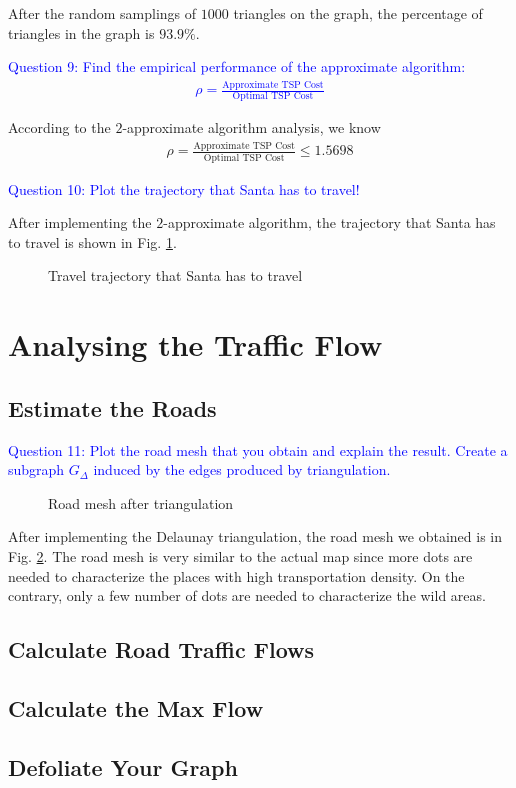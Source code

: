 \documentclass[11pt]{article}
\makeatletter
\def\maxwidth{\ifdim\Gin@nat@width>\linewidth\linewidth
    \else\Gin@nat@width\fi}
\let\Oldincludegraphics\includegraphics
\renewcommand{\includegraphics}[1]{\Oldincludegraphics[width=.8\maxwidth]{#1}}
\makeatother
\begin{document}
After the random samplings of $1000$ triangles on the graph, the percentage of triangles in the graph is $93.9\%$.


\textcolor{blue}{
    Question 9: Find the empirical performance of the approximate algorithm:
    \begin{align}
    \rho=\frac{\text{Approximate TSP Cost}}{\text{Optimal TSP Cost}}
    \end{align}
}

According to the $2$-approximate algorithm analysis, we know
\begin{align}
\rho=\frac{\text{Approximate TSP Cost}}{\text{Optimal TSP Cost}}\le 1.5698
\end{align}


\textcolor{blue}{
    Question 10: Plot the trajectory that Santa has to travel!
}

After implementing the $2$-approximate algorithm, the trajectory that Santa has to travel is shown in Fig. \ref{fig:tour}.


\begin{figure}[t]
\centering
{}
\caption{Travel trajectory that Santa has to travel}
\label{fig:tour}
\end{figure}





\section{Analysing the Traffic Flow}

\subsection{Estimate the Roads}
\textcolor{blue}{
    Question 11: Plot the road mesh that you obtain and explain the result.
Create a subgraph $G_{\Delta}$ induced by the edges produced by triangulation.
}
\begin{figure}[t]
\centering
{}
\caption{Road mesh after triangulation}
\label{fig:road_mesh}
\end{figure}

After implementing the Delaunay triangulation, the road mesh we obtained is in Fig. \ref{fig:road_mesh}. The road mesh is very similar to the actual map since more dots are needed to characterize the places with high transportation density. On the contrary, only a few number of dots are needed to characterize the wild areas. 



\subsection{Calculate Road Traffic Flows}

\subsection{Calculate the Max Flow}

\subsection{Defoliate Your Graph}
\end{document}
